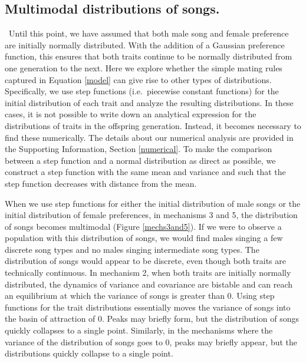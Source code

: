 \documentclass[12pt]{article}
\begin{document}
\subsection*{Multimodal distributions of songs. }
\ Until this point, we have assumed that both male song and female preference are initially normally distributed. With the addition of a Gaussian preference function, this ensures that both traits continue to be normally distributed from one generation to the next. Here we explore whether the simple mating rules captured in Equation \ref{model} can give rise to other types of distributions. Specifically, we use step functions (i.e.\ piecewise constant functions) for the initial distribution of each trait and analyze the resulting distributions. In these cases, it is not possible to write down an analytical expression for the distributions of traits in the offspring generation. Instead, it becomes necessary to find these numerically. The details about our numerical analysis are provided in the Supporting Information, Section \ref{numerical}. To make the comparison between a step function and a normal distribution as direct as possible, we construct a step function with the same mean and variance and such that the step function decreases with distance from the mean.  
  
When we use step functions for either the initial distribution of male songs or the initial distribution of female preferences, in mechanisms 3 and 5, the distribution of songs becomes multimodal (Figure \ref{mechs3and5}). If we were to observe a population with this distribution of songs, we would find males singing a few discrete song types and no males singing intermediate song types. The distribution of songs would appear to be discrete, even though both traits are technically continuous. In mechanism 2, when both traits are initially normally distributed, the dynamics of variance and covariance are bistable and can reach an equilibrium at which the variance of songs is greater than $0$. Using step functions for the trait distributions essentially moves the variance of songs into the basin of attraction of $0$. Peaks may briefly form, but the distribution of songs quickly collapses to a single point. Similarly, in the mechanisms where the variance of the distribution of songs goes to $0$, peaks may briefly appear, but the distributions quickly collapse to a single point.  
\end{document}
